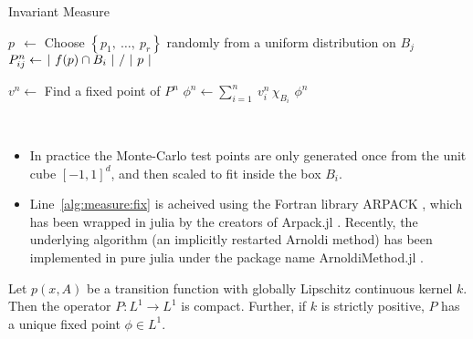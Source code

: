 \begin{algorithm}
    \caption{Invariant Measure}
    \label{alg:measure}
    \begin{spacing}{1.2}
        \begin{algorithmic}[1]

                \State $p\ \ \gets $ Choose $\left\{ p_1,\ \ldots,\ p_r \right\}$ randomly from a uniform distribution on $B_j$
                \State $P_{ij}^n \gets \left. |\ f(p) \cap B_i\ | \ \middle/\ |\ p\ | \right.$
            \EndFor
    
            \State $v^n \gets $ Find a fixed point of $P^n$
            \label{alg:measure:fix}
            \State $\phi^n \gets \sum_{i=1}^n\: v_i^n\, \chi_{B_i}$
            \State \Return $\phi^n$
        \end{algorithmic}
    \end{spacing}
\end{algorithm}

\begin{remark}\ 
    \begin{itemize}
        \item In practice the Monte-Carlo test points are only generated once from the unit cube 
        $[-1,1]^d$, and then scaled to fit inside the box $B_i$.
        \item Line~\ref{alg:measure:fix} is acheived using the Fortran library ARPACK \cite*{ARPACK}, 
        which has been wrapped in julia by the creators of Arpack.jl \cite*{Arpack.jl}. Recently, the 
        underlying algorithm (an implicitly restarted Arnoldi method) has been 
        implemented in pure julia under the package name ArnoldiMethod.jl \cite*{ArnoldiMethod.jl}. \\
    \end{itemize}
\end{remark}

\begin{proposition}
    \cite*{lasota}
    Let $p(x, A)$ be a transition function with globally Lipschitz continuous kernel $k$. 
    Then the operator $P : L^1 \to L^1$ is compact. Further, if $k$ is strictly positive, 
    $P$ has a unique fixed point $\phi \in L^1$. 
\end{proposition}


